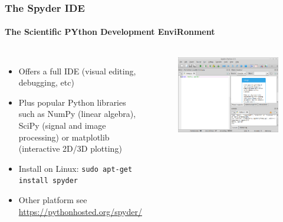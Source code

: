\documentclass{beamer}
\begin{document}
	\begin{frame}
	\frametitle{The Spyder IDE}
	\framesubtitle{The Scientific PYthon Development EnviRonment}
	\begin{columns}
	\begin{itemize}	
		\item Offers a full IDE (visual editing, debugging, etc)
		\item Plus popular Python libraries such as NumPy (linear algebra), SciPy (signal and image processing) or matplotlib (interactive 2D/3D plotting)
		\item Install on Linux: \texttt{sudo apt-get install spyder}
		\item Other platform see \url{https://pythonhosted.org/spyder/}
	\end{itemize}
	        \begin{figure}[h]
                \centering
                \includegraphics[width=\textwidth]{./images/spyder-screenshot}
        	\end{figure}
	\end{columns}
	\end{frame}
\end{document}

